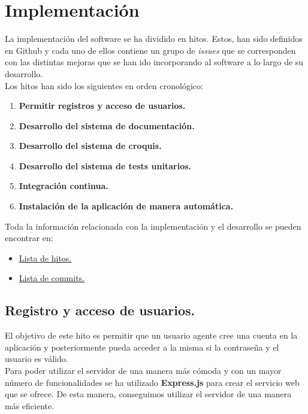 \chapter{Implementación}

La implementación del software se ha dividido en hitos. Estos, han sido definidos en Github
y cada uno de ellos contiene un grupo de \textit{issues} que se corresponden con las distintas
mejoras que se han ido incorporando al software a lo largo de su desarrollo.\\

Los hitos han sido los siguientes en orden cronológico:

\begin{enumerate}
	\item \textbf{Permitir registros y acceso de usuarios.}
	\item \textbf{Desarrollo del sistema de documentación.}
	\item \textbf{Desarrollo del sistema de croquis.}
	\item \textbf{Desarrollo del sistema de tests unitarios.}
	\item \textbf{Integración continua.}
	\item \textbf{Instalación de la aplicación de manera automática.}
\end{enumerate}

Toda la información relacionada con la implementación y el desarrollo se pueden encontrar en:

\begin{itemize}
	\item \href{https://github.com/Cerv1/Chief/milestones}{Lista de hitos.}
	\item \href{https://github.com/Cerv1/Chief/commits}{Lista de commits.}
\end{itemize}

\newpage

\section{Registro y acceso de usuarios.}
El objetivo de este hito es permitir que un usuario agente cree una cuenta en la aplicación 
y posteriormente pueda acceder a la misma si la contraseña y el usuario es válido. \\

Para poder utilizar el servidor de una manera más cómoda y con un mayor número de funcionalidades se ha utilizado
\textbf{Express.js}\cite{express} para crear el servicio web que se ofrece. De esta manera, conseguimos utilizar el 
servidor de una manera más eficiente.\\


